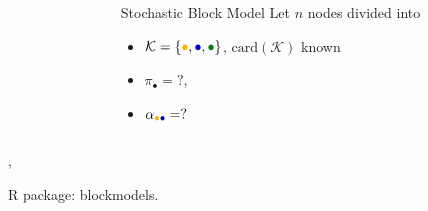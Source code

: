\documentclass[compress,10pt]{beamer}
\begin{document}
\begin{frame}
\begin{center}
\begin{overlayarea}{\textwidth}{.5\textheight}
\begin{columns}
\begin{column}{.45\paperwidth}
        \end{column}
        \begin{column}{.5\paperwidth}
          \begin{small}
            \begin{block}{Stochastic Block Model}
              Let $n$ nodes divided into
              \begin{itemize}
              \item
                $\mathcal{K}=\{\textcolor{yellow!40!orange}{\bullet},\textcolor{blue!80!black}{\bullet},\textcolor{green!50!black}{\bullet}\}$,
                $\text{card}(\mathcal{K})$ known
              \item  $\pi_\bullet  =  ?$,
              \item      $\alpha_{\textcolor{yellow!40!orange}{\bullet}\textcolor{blue!80!black}{\bullet}}     =      ?$
              \end{itemize}
            \end{block}
          \end{small}
        \end{column}
      \end{columns}
    \end{overlayarea}
    \end{center}
    \medskip

    
    \textcolor{mygreen}{\cite{nowickiSnijders2001}, \cite{daudin2008mixture}}
    
    \bigskip
    
\textcolor{mygreen}{R package: blockmodels.}
%     

\end{frame}
\end{document}
